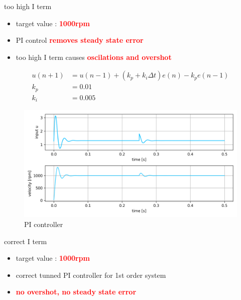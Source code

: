 \documentclass[12pt,twoside,onecolumn,openany,extrafontsizes,dvipsnames]{memoir}
\begin{document}
                too high I term 

                \begin{itemize}
                    \item  target value : \textcolor{red}{\textbf {1000rpm}}
                    \item  PI control \textcolor{red}{\textbf {removes steady state error}}
                    \item  too high I term causes \textcolor{red}{\textbf {oscilations and overshot}}
                \end{itemize}
            
              
                \begin{align*}
                    u(n+1) &= u(n-1) + (k_p + k_i\Delta t) e(n) - k_pe(n-1) \\
                    k_p    &= 0.01 \\
                    k_i    &= 0.005
                \end{align*}
                
                
                \begin{figure}[!htb]
                    \centering
                    \includegraphics[scale=0.8]{../images/motor_control/pid_pi_control_0.png}
                    \caption{PI controller}
                    \label{fig:pi_controller}
                \end{figure}

                correct I term

                \begin{itemize}
                    \item  target value : \textcolor{red}{\textbf {1000rpm}}
                    \item  correct tunned PI controller for 1st order system
                    \item  \textcolor{red}{\textbf {no overshot, no steady state error}}
                \end{itemize}
                
\end{document}

